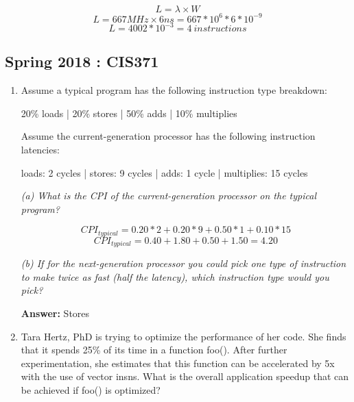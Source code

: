 \documentclass[12pt]{article}
\newenvironment{QandA}{\begin{enumerate}[label=\bfseries\alph*.]\bfseries}
                      {\end{enumerate}}
\newenvironment{answered}{\par\quad\normalfont}{}
\begin{document}
\begin{QandA}
    \begin{equation*}
        L = \lambda \times W
    \end{equation*}
    \begin{equation*}
        L = 667 MHz \times 6ns = 667 * 10^{6} * 6 * 10^{-9}
    \end{equation*}
    \begin{equation*}
        L = 4002 * 10^{-3} = 4\ instructions
    \end{equation*}
\end{QandA}

\subsection{Spring 2018 : CIS371}

\begin{QandA}
   \item Assume a typical program has the following instruction type breakdown:
   
    20\% loads | 20\% stores | 50\% adds | 10\% multiplies

    Assume the current-generation processor has the following instruction latencies:
    
    loads: 2 cycles | stores: 9 cycles | adds: 1 cycle | multiplies: 15 cycles

    \begin{answered}
    
    \textit{(a) What is the CPI of the current-generation processor on the typical program?}
    
    \begin{equation*}
        CPI_{typical} = 0.20 * 2 + 0.20 * 9 + 0.50 * 1 + 0.10 * 15
    \end{equation*}
    \begin{equation*}
        CPI_{typical} = 0.40 + 1.80 + 0.50 + 1.50 = 4.20
    \end{equation*}
    
    \textit{(b) If for the next-generation processor you could pick one type of instruction to make twice as fast (half the latency), which instruction type would you pick?}
    
    \textbf{Answer:} Stores
    \end{answered}
    
    \item Tara Hertz, PhD is trying to optimize the performance of her code. She finds that it spends 25\% of its time in a function foo(). After further experimentation, she estimates that this function can be accelerated by 5x with the use of vector insns. What is the overall application speedup that can be achieved if foo() is optimized?
    

\end{QandA}
\end{document}
